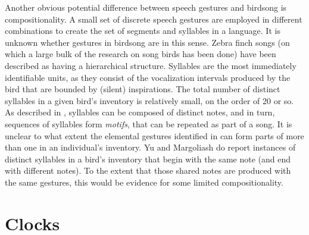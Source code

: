 \documentclass[output=paper,
modfonts
]{LSP/langsci}
\begin{document}
Another obvious potential difference between speech gestures and birdsong is compositionality. A small set of discrete speech gestures are employed in different combinations to create the set of segments and syllables in a language. It is unknown whether gestures in birdsong are  in this sense. Zebra finch songs (on which a large bulk of the research on song birds has been done) have been described as having a hierarchical structure. Syllables are the most immediately identifiable units, as they consist of the vocalization intervals produced by the bird that are bounded by (silent) inspirations. The total number of distinct syllables in a given bird's inventory is relatively small, on the order of 20 or so. As described in \citet{YuMargoliash96},  syllables can be composed of distinct notes, and in turn, sequences of syllables form \textit{motifs}, that can be repeated as part of a song. It is unclear to what extent the elemental gestures identified in \citet{Amador2013} can form parts of more than one  in an individual's inventory.  Yu and Margoliash \citeyearpar{YuMargoliash96} do report instances of distinct syllables in a bird's inventory that begin with the same note (and end with different notes). To the extent that those shared notes are produced with the same gestures, this would be evidence for some limited compositionality.

\section{Clocks}
\end{document}
